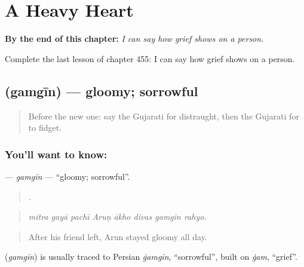 
\chapter{A Heavy Heart}
\label{ch:gu-a-heavy-heart}

\begin{chapteropening}
\textbf{By the end of this chapter:} \emph{I can say how grief shows on a person.}

Complete the last lesson of chapter 455: I can say how grief shows on a person.
\end{chapteropening}

\section[\texorpdfstring{\gu{ગમગીન} (gamgīn)}{ગમગીન (gamgīn)}]{ (gamgīn) — gloomy; sorrowful}

\label{lesson:GU-C455-gamgin}



\begin{quote}
Before the new one: say the Gujarati for distraught, then the Gujarati for to fidget.
\end{quote}

\subsection*{You'll want to know: }
\textbf{} — \emph{gamgīn} — \textquotedblleft{}gloomy; sorrowful\textquotedblright{}.

\begin{quote}
       .
\end{quote}

\begin{quote}
\emph{mitra gayā pachī Aruṇ ākho divas gamgīn rahyo.}
\end{quote}

\begin{quote}
After his friend left, Arun stayed gloomy all day.
\end{quote}

\begin{cousinweb}
\textbf{} (\emph{gamgīn}) is usually traced to Persian \emph{ġamgīn}, \textquotedblleft{}sorrowful\textquotedblright{}, built on \emph{ġam}, \textquotedblleft{}grief\textquotedblright{}.
\end{cousinweb}

